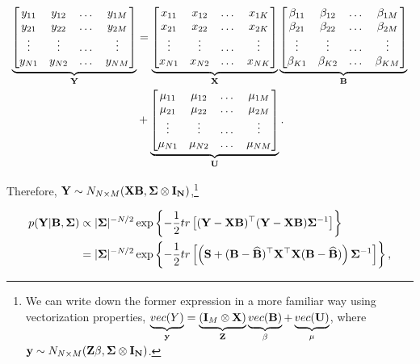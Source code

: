 \begin{align*}
	\underbrace{
		\begin{bmatrix}
			y_{11} & y_{12} & \dots & y_{1M}\\
			y_{21} & y_{22} & \dots & y_{2M}\\
			\vdots & \vdots & \dots & \vdots\\
			y_{N1} & y_{N2} & \dots & y_{NM}\\
	\end{bmatrix}}_{\bf{Y}}
	&=
	\underbrace{\begin{bmatrix}
			x_{11} & x_{12} & \dots & x_{1K}\\
			x_{21} & x_{22} & \dots & x_{2K}\\
			\vdots & \vdots & \dots & \vdots\\
			x_{N1} & x_{N2} & \dots & x_{NK}\\
	\end{bmatrix}}_{\bf{X}}
	\underbrace{
		\begin{bmatrix}
			\beta_{11} & \beta_{12} & \dots & \beta_{1M}\\
			\beta_{21} & \beta_{22} & \dots & \beta_{2M}\\
			\vdots & \vdots & \dots & \vdots\\
			\beta_{K1} & \beta_{K2} & \dots & \beta_{KM}\\
	\end{bmatrix}}_{\bf{B}}\\
	&+
	\underbrace{\begin{bmatrix}
			\mu_{11} & \mu_{12} & \dots & \mu_{1M}\\
			\mu_{21} & \mu_{22} & \dots & \mu_{2M}\\
			\vdots & \vdots & \dots & \vdots\\
			\mu_{N1} & \mu_{N2} & \dots & \mu_{NM}\\
	\end{bmatrix}}_{\bf{U}}.
\end{align*}

Therefore, ${\bf{Y}}\sim N_{N\times M}({\bf{X}}{\bf{B}},\bf{\Sigma}\otimes {\bf{I}}_N)$,\footnote{We can write down the former expression in a more familiar way using vectorization properties,
$\underbrace{vec(Y)}_{\bf{y}}=\underbrace{({\bf{I}}_M\otimes {\bf{X}})}_{{\bf{Z}}}\underbrace{vec({\bf{B}})}_{\beta}+\underbrace{vec({\bf{U}})}_{\mu}$, where ${\bf{y}}\sim N_{N\times M}({\bf{Z}}\beta,\bf{\Sigma}\otimes {\bf{I}}_N)$.}

\begin{align*}
	p({\bf{Y}}| {\bf{B}},{\bf\Sigma})&\propto |{{\bf \Sigma}}|^{-N/2}\exp\left\lbrace -\frac{1}{2}tr\left[({\bf{Y}}-{\bf{X}}{\bf{B}})^{\top}({\bf{Y}}-{\bf{X}}{\bf{B}}){{\bf \Sigma}}^{-1}\right]\right\rbrace
	\\
	&=|{{\bf \Sigma}}|^{-N/2}\exp\left\lbrace -\frac{1}{2}tr\left[\left({\bf{S}}+({\bf{B}}-\widehat{\bf{B}})^{\top}{\bf{X}}^{\top}{\bf{X}}({\bf{B}}-\widehat{\bf{B}})\right){{\bf \Sigma}}^{-1}\right]\right\rbrace,
\end{align*}

